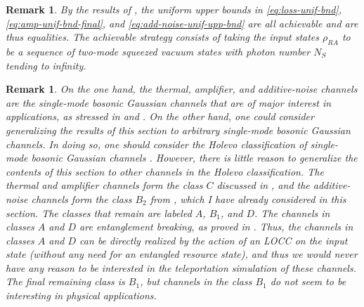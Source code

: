 \documentclass[apsrev,twocolumn]{revtex4-1}%
\newtheorem{remark}[theorem]{Remark}
\begin{document}


\begin{remark}
By the results of \cite{TW16}, the uniform upper bounds in
\eqref{eq:loss-unif-bnd}, \eqref{eq:amp-unif-bnd-final}, and
\eqref{eq:add-noise-unif-upp-bnd} are all achievable and are thus equalities.
The achievable strategy consists of taking the input states $\rho_{RA}$ to be
a sequence of two-mode squeezed vacuum states with photon number $N_{S}$
tending to infinity.
\end{remark}

\begin{remark}
On the one hand, the thermal, amplifier, and additive-noise channels are the single-mode
bosonic Gaussian channels that are of major interest in applications, as
stressed in \cite[Section~3.5]{HG12} and \cite[Section~12.6.3]{H12}. On the
other hand, one could consider generalizing the results of this section to
arbitrary single-mode bosonic Gaussian channels.
In doing so, one should consider the Holevo classification of single-mode
bosonic Gaussian channels \cite{Holevo2007}. However, there is little reason
to generalize the contents of this section to other channels in the Holevo
classification. The thermal and amplifier channels form the class $C$
discussed in \cite{Holevo2007}, and the additive-noise channels form the class
$B_{2}$ from \cite{Holevo2007}, which I have already considered in this
section. The classes that remain are labeled $A$, $B_{1}$, and $D$. The
channels in classes $A$ and $D$ are \textit{entanglement breaking}, as proved
in \cite{Holevo2008}. Thus, the channels in classes $A$ and $D$ can be
directly realized by the action of an LOCC on the input state (without any
need for an entangled resource state), and thus we would never have any reason
to be interested in the teleportation simulation of these channels. The final
remaining class is $B_{1}$,
but channels in the class $B_{1}$ do not seem to be interesting in physical applications.
\end{remark}
\end{document}
